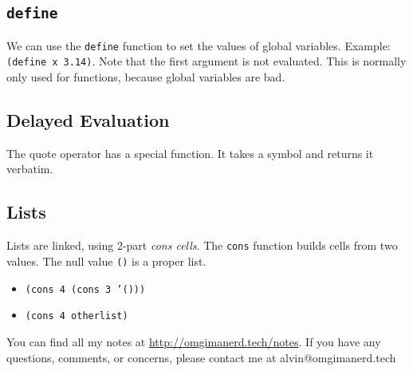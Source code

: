 \documentclass{math}
\begin{document}
\subsection*{\texttt{define}}
We can use the \texttt{define} function to set the values of global variables.
Example: \texttt{(define x 3.14)}. Note that the first argument is not
evaluated. This is normally only used for functions, because global variables
are bad.

\subsection*{Delayed Evaluation}
The quote operator has a special function. It takes a symbol and returns it
verbatim.

\subsection*{Lists}
Lists are linked, using 2-part \textit{cons cells}. The \texttt{cons} function
builds cells from two values. The null value \texttt{()} is a proper list.
\begin{itemize}
  \item \texttt{(cons 4 (cons 3 '()))}
  \item \texttt{(cons 4 otherlist)}
\end{itemize}

\begin{center}
  You can find all my notes at \url{http://omgimanerd.tech/notes}. If you have
  any questions, comments, or concerns, please contact me at
  alvin@omgimanerd.tech
\end{center}
\end{document}

